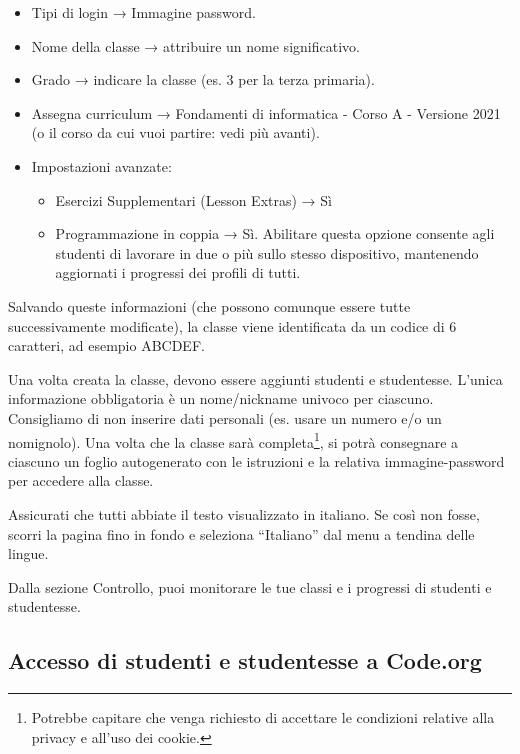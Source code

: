 \begin{itemize}
\item
  Tipi di login → Immagine password.
\item
  Nome della classe → attribuire un nome significativo.
\item
  Grado → indicare la classe (es. 3 per la terza primaria).
\item
  Assegna curriculum → Fondamenti di informatica - Corso A - Versione 2021 (o il corso da cui vuoi partire: vedi più avanti).
\item
  Impostazioni avanzate:

  \begin{itemize}
  \item
    Esercizi Supplementari (Lesson Extras) → Sì
  \item
    Programmazione in coppia → Sì. Abilitare questa opzione consente agli studenti di lavorare in due o più sullo stesso dispositivo, mantenendo aggiornati i progressi dei profili di tutti.
  \end{itemize}
\end{itemize}


Salvando queste informazioni (che possono comunque essere tutte successivamente modificate), la classe viene identificata da un codice di 6 caratteri, ad esempio ABCDEF.

Una volta creata la classe, devono essere aggiunti studenti e studentesse. L'unica informazione obbligatoria è un nome/nickname univoco per ciascuno. Consigliamo di non inserire dati personali (es. usare un numero e/o un nomignolo). Una volta che la classe sarà completa\footnote{Potrebbe capitare che venga richiesto di accettare le condizioni relative alla privacy e all'uso dei cookie.}, si potrà consegnare a ciascuno un foglio autogenerato con le istruzioni e la relativa immagine-password per accedere alla classe.

Assicurati che tutti abbiate il testo visualizzato in italiano. Se così non fosse, scorri la pagina fino in fondo e seleziona ``Italiano'' dal menu a tendina delle lingue.

Dalla sezione Controllo, puoi monitorare le tue classi e i progressi di studenti e studentesse.

\subsection{Accesso di studenti e studentesse a Code.org }\label{accesso-di-studenti-e-studentesse-a-code.org}

